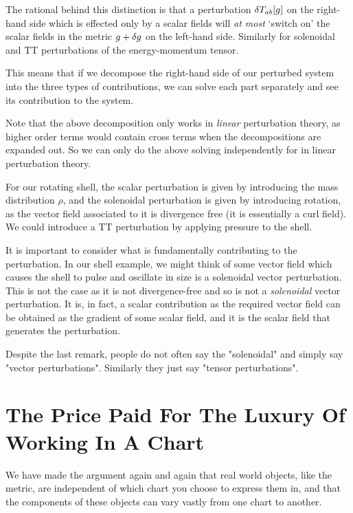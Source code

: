 The rational behind this distinction is that a perturbation $\delta T_{ab}[g]$ on the right-hand side which is effected only by a scalar fields will \textit{at most} `switch on' the scalar fields in the metric $g+\delta g$ on the left-hand side. Similarly for solenoidal and TT perturbations of the energy-momentum tensor.

This means that if we decompose the right-hand side of our perturbed system into the three types of contributions, we can solve each part separately and see its contribution to the system. 

\br 
    Note that the above decomposition only works in \textit{linear} perturbation theory, as higher order terms would contain cross terms when the decompositions are expanded out. So we can only do the above solving independently for in linear perturbation theory.
\er 

\bex 
    For our rotating shell, the scalar perturbation is given by introducing the mass distribution $\rho$, and the solenoidal perturbation is given by introducing rotation, as the vector field associated to it is divergence free (it is essentially a curl field). We could introduce a TT perturbation by applying pressure to the shell. 
\eex 

\br 
    It is important to consider what is fundamentally contributing to the perturbation. In our shell example, we might think of some vector field which causes the shell to pulse and oscillate in size is a solenoidal vector perturbation. This is not the case as it is not divergence-free and so is not a \textit{solenoidal} vector perturbation. It is, in fact, a scalar contribution as the required vector field can be obtained as the gradient of some scalar field, and it is the scalar field that generates the perturbation. 
\er 

\bter
    Despite the last remark, people do not often say the "solenoidal" and simply say "vector perturbations". Similarly they just say "tensor perturbations".
\eter 

\section{The Price Paid For The Luxury Of Working In A Chart}

We have made the argument again and again that real world objects, like the metric, are independent of which chart you choose to express them in, and that the components of these objects can vary vastly from one chart to another. 

